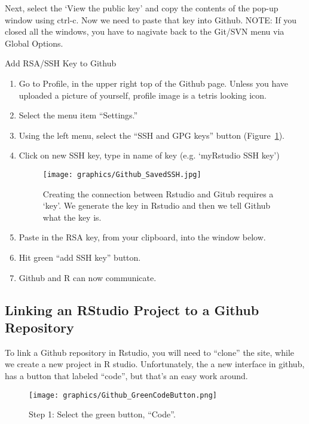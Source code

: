 \documentclass[12pt]{../SOP4_alpha}\usepackage[]{graphicx}\usepackage[]{xcolor}
\begin{document}
\NP Next, select the `View the public key' and copy the contents of the pop-up window using ctrl-c. Now we need to paste that key into Github. NOTE: If you closed all the windows, you have to nagivate back to the Git/SVN menu via Global Options. 

\NP Add RSA/SSH Key to Github
  \begin{enumerate}
  \item Go to Profile, in the upper right top of the Github page. Unless you have uploaded a picture of yourself, profile image is a tetris looking icon.
  \item Select the menu item ``Settings.''
  \item Using the left menu, select the ``SSH and GPG keys'' button (Figure~\ref{fig:githubkey}).
  \item Click on new SSH key, type in name of key (e.g. `myRstudio SSH key')
  
\begin{figure}
\centering
\texttt{[image: graphics/Github\_SavedSSH.jpg]}
\caption{Creating the connection between Rstudio and Gitub requires a `key'. We generate the key in Rstudio and then we tell Github what the key is.}
\label{fig:githubkey}
\end{figure}

  \item Paste in the RSA key, from your clipboard, into the window below.
  \item Hit green ``add SSH key'' button.
  \item Github and R can now communicate.
  \end{enumerate}


\subsection{Linking an RStudio Project to a Github Repository}

\NP To link a Github repository in Rstudio, you will need to ``clone'' the site, while we create a new project in R studio. Unfortunately, the a new interface in github, has a button that labeled ``code'', but that's an easy work around.

\begin{figure}[H]
\centering
\texttt{[image: graphics/Github\_GreenCodeButton.png]}
\caption{Step 1: Select the green button, ``Code''.}
\label{fig:step1}
\end{figure}
\end{document}
